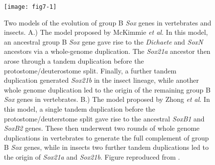 \begin{figure}
\centering
\texttt{[image: fig7-1]}
\caption{Two models of the evolution of group B \emph{Sox} genes in vertebrates and insects. A.) The model proposed by McKimmie \emph{et al.} In this model, an ancestral group B \emph{Sox} gene gave rise to the \emph{Dichaete} and \emph{SoxN} ancestors via a whole-genome duplication. The \emph{Sox21a} ancestor then arose through a tandem duplication before the protostome/deuterostome split. Finally, a further tandem duplication generated \emph{Sox21b} in the insect lineage, while another whole genome duplication led to the origin of the remaining group B \emph{Sox} genes in vertebrates. B.) The model proposed by Zhong \emph{et al}. In this model, a single tandem duplication before the protostome/deuterstome split gave rise to the ancestral \emph{SoxB1} and \emph{SoxB2} genes. These then underwent two rounds of whole genome duplications in vertebrates to generate the full complement of group B \emph{Sox} genes, while in insects two further tandem duplications led to the origin of \emph{Sox21a} and \emph{Sox21b}. Figure reproduced from \citet{zhong_parallel_2011}.}
\label{Figure 7.1}
\end{figure}

